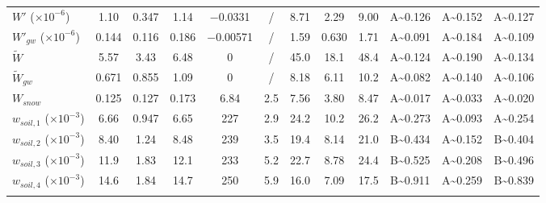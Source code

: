 \begin{tabular}{lccccccccccc}
    \(W'\) (\(\times 10^{-6}\))         & \num{1.10}   & \num{0.347}  & \num{1.14}  & \num{-0.0331}  & /         & \num{8.71}  & \num{2.29}  & \num{9.00} & A\textasciitilde\num{0.126} & A\textasciitilde\num{0.152} & A\textasciitilde\num{0.127} \\
    \(W'_{gw}\) (\(\times 10^{-6}\))    & \num{0.144}  & \num{0.116}  & \num{0.186} & \num{-0.00571} & /         & \num{1.59}  & \num{0.630} & \num{1.71} & A\textasciitilde\num{0.091} & A\textasciitilde\num{0.184} & A\textasciitilde\num{0.109} \\
    \(\tilde{W}\)                       & \num{5.57}   & \num{3.43}   & \num{6.48}  & \num{0}        & /         & \num{45.0}  & \num{18.1}  & \num{48.4} & A\textasciitilde\num{0.124} & A\textasciitilde\num{0.190} & A\textasciitilde\num{0.134} \\
    \(\tilde{W}_{gw}\)                  & \num{0.671}  & \num{0.855}  & \num{1.09}  & \num{0}        & /         & \num{8.18}  & \num{6.11}  & \num{10.2} & A\textasciitilde\num{0.082} & A\textasciitilde\num{0.140} & A\textasciitilde\num{0.106} \\
    \(W_{snow}\)                        & \num{0.125}  & \num{0.127}  & \num{0.173} & \num{6.84}     & \num{2.5} & \num{7.56}  & \num{3.80}  & \num{8.47} & A\textasciitilde\num{0.017} & A\textasciitilde\num{0.033} & A\textasciitilde\num{0.020} \\
    \(w_{soil,1}\) (\(\times 10^{-3}\)) & \num{6.66}   & \num{0.947}  & \num{6.65}  & \num{227}      & \num{2.9} & \num{24.2}  & \num{10.2}  & \num{26.2} & A\textasciitilde\num{0.273} & A\textasciitilde\num{0.093} & A\textasciitilde\num{0.254} \\
    \(w_{soil,2}\) (\(\times 10^{-3}\)) & \num{8.40}   & \num{1.24}   & \num{8.48}  & \num{239}      & \num{3.5} & \num{19.4}  & \num{8.14}  & \num{21.0} & B\textasciitilde\num{0.434} & A\textasciitilde\num{0.152} & B\textasciitilde\num{0.404} \\
    \(w_{soil,3}\) (\(\times 10^{-3}\)) & \num{11.9}   & \num{1.83}   & \num{12.1}  & \num{233}      & \num{5.2} & \num{22.7}  & \num{8.78}  & \num{24.4} & B\textasciitilde\num{0.525} & A\textasciitilde\num{0.208} & B\textasciitilde\num{0.496} \\
    \(w_{soil,4}\) (\(\times 10^{-3}\)) & \num{14.6}   & \num{1.84}   & \num{14.7}  & \num{250}      & \num{5.9} & \num{16.0}  & \num{7.09}  & \num{17.5} & B\textasciitilde\num{0.911} & A\textasciitilde\num{0.259} & B\textasciitilde\num{0.839} \\
    \bottomhline
\end{tabular}
